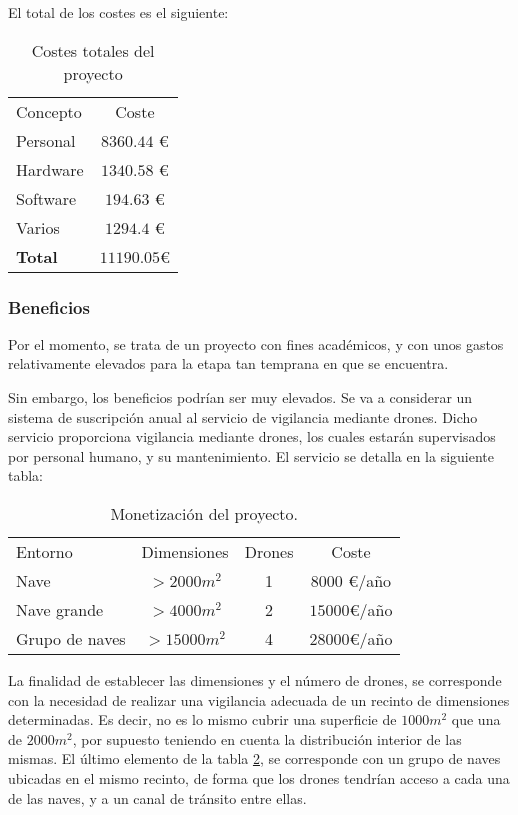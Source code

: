 El total de los costes es el siguiente: 
\begin{table}[H]
	\begin{center}
		\begin{tabular}{l | c}\hline
			\toprule
			Concepto & Coste\\
			\otoprule
			Personal & $8360.44$ \euro \\
			Hardware & $1340.58$ \euro \\
			Software & $194.63$ \euro\\
			Varios & $1294.4$ \euro\\
			\hline
			\textbf{Total} & $11190.05 $\euro\\
			\bottomrule
		\end{tabular}
		\caption{Costes totales del proyecto}
		\label{tb:costesTotales}
	\end{center}
\end{table}


\subsubsection{Beneficios}

Por el momento, se trata de un proyecto con fines académicos, y con unos gastos relativamente elevados para la etapa tan temprana en que se encuentra. 

Sin embargo, los beneficios podrían ser muy elevados. Se va a considerar un sistema de suscripción anual al servicio de vigilancia mediante drones. Dicho servicio proporciona vigilancia mediante drones, los cuales estarán supervisados por personal humano, y su mantenimiento. El servicio se detalla en la siguiente tabla: 
\begin{table}[H]
\begin{center}
		\begin{tabular}{l | c | c | c}\hline
			\toprule
			Entorno & Dimensiones & Drones & Coste\\
			\otoprule
			Nave & $>2000 m^2$ &  1 & $8000$ \euro/año\\
			Nave grande & $>4000 m^2$ & 2 & $15000 $\euro/año\\
			Grupo de naves & $>15000 m^2$ & 4 & $28000$\euro/año\\
			\hline
			\bottomrule
		\end{tabular}
		\caption{Monetización del proyecto.}
		\label{tb:money}
		\end{center}
\end{table}

La finalidad de establecer las dimensiones y el número de drones, se corresponde con la necesidad de realizar una vigilancia adecuada de un recinto de dimensiones determinadas. Es decir, no es lo mismo cubrir una superficie de $1000m^2$ que una de $2000m^2$, por supuesto teniendo en cuenta la distribución interior de las mismas. 
El último elemento de la tabla \ref{tb:money}, se corresponde con un grupo de naves ubicadas en el mismo recinto, de forma que los drones tendrían acceso a cada una de las naves, y a un canal de tránsito entre ellas. 


